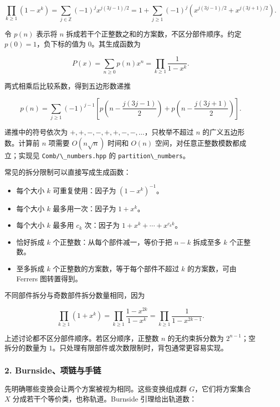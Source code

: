 \[
\prod_{k\ge1}(1-x^k)
=\sum_{j\in\mathbb Z}(-1)^j x^{j(3j-1)/2}
=1+\sum_{j\ge1}(-1)^j
 \left(x^{j(3j-1)/2}+x^{j(3j+1)/2}\right).
\]

令 \(p(n)\) 表示将 \(n\) 拆成若干个正整数之和的方案数，不区分部件顺序。约定 \(p(0)=1\)，负下标的值为 \(0\)。其生成函数为

\[
P(x)=\sum_{n\ge0}p(n)x^n=\prod_{k\ge1}\frac{1}{1-x^k}.
\]

两式相乘后比较系数，得到五边形数递推

\[
p(n)=\sum_{j\ge1}(-1)^{j-1}
\left[
 p\left(n-\frac{j(3j-1)}{2}\right)
 +p\left(n-\frac{j(3j+1)}{2}\right)
\right].
\]

递推中的符号依次为 \(+,+,-,-,+,+,-,-,\ldots\)，只枚举不超过 \(n\) 的广义五边形数。计算前 \(n\) 项需要 \(O(n\sqrt n)\) 时间和 \(O(n)\) 空间，对任意正整数模数都成立；实现见 \passthrough{\lstinline!Comb/\_numbers.hpp!} 的 \passthrough{\lstinline!partition\_numbers!}。

常见的拆分限制可以直接写成生成函数：

\begin{itemize}
\tightlist
\item
  每个大小 \(k\) 可重复使用：因子为 \((1-x^k)^{-1}\)。
\item
  每个大小 \(k\) 最多用一次：因子为 \(1+x^k\)。
\item
  每个大小 \(k\) 最多用 \(c_k\) 次：因子为 \(1+x^k+\cdots+x^{c_k k}\)。
\item
  恰好拆成 \(k\) 个正整数：从每个部件减一，等价于把 \(n-k\) 拆成至多 \(k\) 个正整数。
\item
  至多拆成 \(k\) 个正整数的方案数，等于每个部件不超过 \(k\) 的方案数，可由 Ferrers 图转置得到。
\end{itemize}

不同部件拆分与奇数部件拆分数量相同，因为

\[
\prod_{k\ge1}(1+x^k)
=\prod_{k\ge1}\frac{1-x^{2k}}{1-x^k}
=\prod_{k\ge1}\frac{1}{1-x^{2k-1}}.
\]

上述讨论都不区分部件顺序。若区分顺序，正整数 \(n\) 的无约束拆分数为 \(2^{n-1}\)；空拆分的数量为 \(1\)。只处理有限部件或次数限制时，背包通常更容易实现。

\hypertarget{burnsideux9879ux94feux4e0eux624bux94fe}{%
\subsubsection{2. Burnside、项链与手链}\label{burnsideux9879ux94feux4e0eux624bux94fe}}

先明确哪些变换会让两个方案被视为相同。这些变换组成群 \(G\)，它们将方案集合 \(X\) 分成若干个等价类，也称轨道。Burnside 引理给出轨道数：

